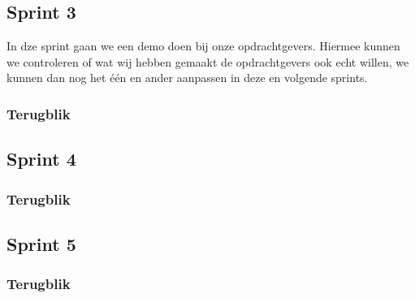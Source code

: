 \subsection{Sprint 3}
In dze sprint gaan we een demo doen bij onze opdrachtgevers. Hiermee kunnen we controleren of wat wij hebben gemaakt de opdrachtgevers ook echt willen, we kunnen dan nog het \'e\'en en ander aanpassen in deze en volgende sprints. 

\subsubsection*{Terugblik}

\subsection{Sprint 4}

\subsubsection*{Terugblik}

\subsection{Sprint 5}

\subsubsection*{Terugblik}

